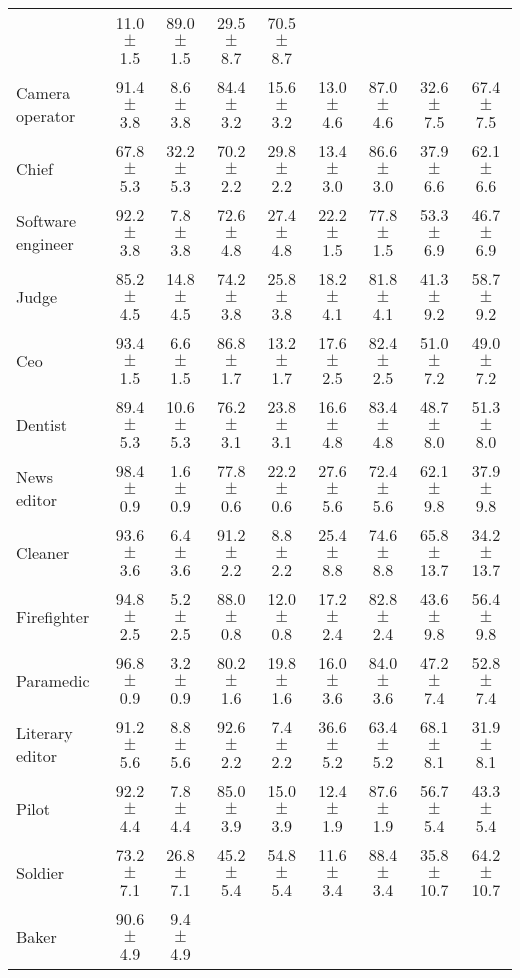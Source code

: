 \begin{table*}[p]
{\begin{tabular}{l|cc|cc|cc|cc}
& 11.0 $\pm$ 1.5 & 89.0 $\pm$ 1.5
& 29.5 $\pm$ 8.7 & 70.5 $\pm$ 8.7
\\
Camera operator
& 91.4 $\pm$ 3.8 & 8.6 $\pm$ 3.8
& 84.4 $\pm$ 3.2 & 15.6 $\pm$ 3.2
& 13.0 $\pm$ 4.6 & 87.0 $\pm$ 4.6
& 32.6 $\pm$ 7.5 & 67.4 $\pm$ 7.5
\\
Chief
& 67.8 $\pm$ 5.3 & 32.2 $\pm$ 5.3
& 70.2 $\pm$ 2.2 & 29.8 $\pm$ 2.2
& 13.4 $\pm$ 3.0 & 86.6 $\pm$ 3.0
& 37.9 $\pm$ 6.6 & 62.1 $\pm$ 6.6
\\
Software engineer
& 92.2 $\pm$ 3.8 & 7.8 $\pm$ 3.8
& 72.6 $\pm$ 4.8 & 27.4 $\pm$ 4.8
& 22.2 $\pm$ 1.5 & 77.8 $\pm$ 1.5
& 53.3 $\pm$ 6.9 & 46.7 $\pm$ 6.9
\\
Judge
& 85.2 $\pm$ 4.5 & 14.8 $\pm$ 4.5
& 74.2 $\pm$ 3.8 & 25.8 $\pm$ 3.8
& 18.2 $\pm$ 4.1 & 81.8 $\pm$ 4.1
& 41.3 $\pm$ 9.2 & 58.7 $\pm$ 9.2
\\
Ceo
& 93.4 $\pm$ 1.5 & 6.6 $\pm$ 1.5
& 86.8 $\pm$ 1.7 & 13.2 $\pm$ 1.7
& 17.6 $\pm$ 2.5 & 82.4 $\pm$ 2.5
& 51.0 $\pm$ 7.2 & 49.0 $\pm$ 7.2
\\
Dentist
& 89.4 $\pm$ 5.3 & 10.6 $\pm$ 5.3
& 76.2 $\pm$ 3.1 & 23.8 $\pm$ 3.1
& 16.6 $\pm$ 4.8 & 83.4 $\pm$ 4.8
& 48.7 $\pm$ 8.0 & 51.3 $\pm$ 8.0
\\
News editor
& 98.4 $\pm$ 0.9 & 1.6 $\pm$ 0.9
& 77.8 $\pm$ 0.6 & 22.2 $\pm$ 0.6
& 27.6 $\pm$ 5.6 & 72.4 $\pm$ 5.6
& 62.1 $\pm$ 9.8 & 37.9 $\pm$ 9.8
\\
Cleaner
& 93.6 $\pm$ 3.6 & 6.4 $\pm$ 3.6
& 91.2 $\pm$ 2.2 & 8.8 $\pm$ 2.2
& 25.4 $\pm$ 8.8 & 74.6 $\pm$ 8.8
& 65.8 $\pm$ 13.7 & 34.2 $\pm$ 13.7
\\
Firefighter
& 94.8 $\pm$ 2.5 & 5.2 $\pm$ 2.5
& 88.0 $\pm$ 0.8 & 12.0 $\pm$ 0.8
& 17.2 $\pm$ 2.4 & 82.8 $\pm$ 2.4
& 43.6 $\pm$ 9.8 & 56.4 $\pm$ 9.8
\\
Paramedic
& 96.8 $\pm$ 0.9 & 3.2 $\pm$ 0.9
& 80.2 $\pm$ 1.6 & 19.8 $\pm$ 1.6
& 16.0 $\pm$ 3.6 & 84.0 $\pm$ 3.6
& 47.2 $\pm$ 7.4 & 52.8 $\pm$ 7.4
\\
Literary editor
& 91.2 $\pm$ 5.6 & 8.8 $\pm$ 5.6
& 92.6 $\pm$ 2.2 & 7.4 $\pm$ 2.2
& 36.6 $\pm$ 5.2 & 63.4 $\pm$ 5.2
& 68.1 $\pm$ 8.1 & 31.9 $\pm$ 8.1
\\
Pilot
& 92.2 $\pm$ 4.4 & 7.8 $\pm$ 4.4
& 85.0 $\pm$ 3.9 & 15.0 $\pm$ 3.9
& 12.4 $\pm$ 1.9 & 87.6 $\pm$ 1.9
& 56.7 $\pm$ 5.4 & 43.3 $\pm$ 5.4
\\
Soldier
& 73.2 $\pm$ 7.1 & 26.8 $\pm$ 7.1
& 45.2 $\pm$ 5.4 & 54.8 $\pm$ 5.4
& 11.6 $\pm$ 3.4 & 88.4 $\pm$ 3.4
& 35.8 $\pm$ 10.7 & 64.2 $\pm$ 10.7
\\
Baker
& 90.6 $\pm$ 4.9 & 9.4 $\pm$ 4.9

\end{tabular}}
\end{table*}
